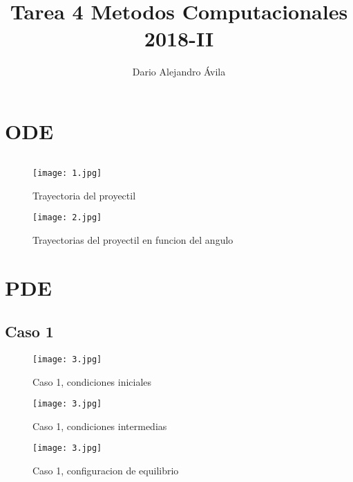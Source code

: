 \documentclass[reprint,amsmath,amssymb]{revtex4-1}
\begin{document}
\title{\Huge Tarea 4 Metodos Computacionales 2018-II }

\author{Dario Alejandro Ávila }




\maketitle
\section{\label{sec:level1}ODE}

\begin{equation}

\end{equation}

\begin{figure}[h!]
    \centering
    \texttt{[image: 1.jpg]}
    \caption{Trayectoria del proyectil}

\end{figure}

\begin{figure}[h!]
    \centering
    \texttt{[image: 2.jpg]}
    \caption{Trayectorias del proyectil en funcion del angulo}
\end{figure}


\section{\label{sec:level1}PDE}
\subsection{Caso 1}



\begin{figure}[h!]
    \centering
    \texttt{[image: 3.jpg]}
    \caption{Caso 1, condiciones iniciales}
\end{figure}

\begin{figure}[h!]
    \centering
    \texttt{[image: 3.jpg]}
    \caption{Caso 1, condiciones intermedias}
\end{figure}

\begin{figure}[h!]
    \centering
    \texttt{[image: 3.jpg]}
    \caption{Caso 1, configuracion de equilibrio}
\end{figure}
\end{document}
